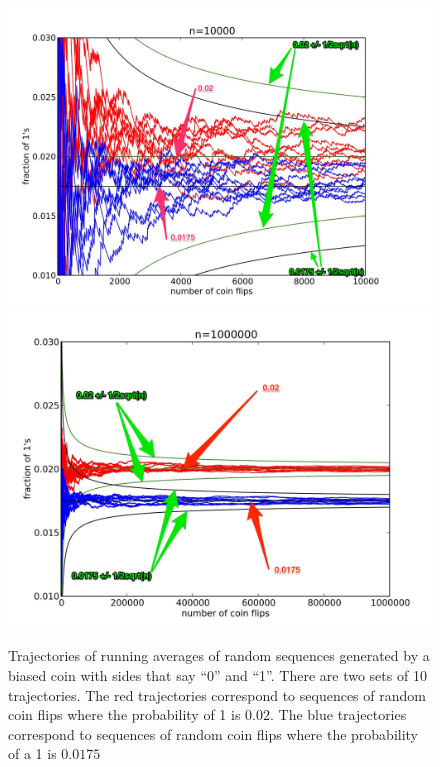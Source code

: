 \documentclass{report}
\theoremstyle{plain}
\theoremstyle{definition}
\begin{document}
\begin{figure}[p]
\begin{center}
\includegraphics[width=5in]{figs/averages10000.png}
\includegraphics[width=5in]{figs/averages1000000.png}
\end{center}
\caption{\label{fig:Averages} Trajectories of running averages of
  random sequences generated by a biased coin with sides that say
  ``0'' and ``1''. There are two sets of 10 trajectories. The red
  trajectories correspond to sequences of random coin flips where the
  probability of 1 is $0.02$. The blue trajectories correspond to
  sequences of random coin flips where the probability of a 1 is
  $0.0175$}
\end{figure}
\end{document}
